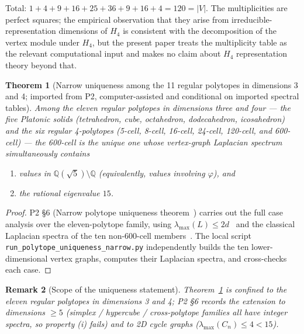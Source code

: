 \documentclass[12pt]{article}
\newtheorem{theorem}{Theorem}
\newtheorem{remark}[theorem]{Remark}
\newcommand{\phig}{\varphi}
\begin{document}
Total: $1+4+9+16+25+36+9+16+4 = 120 = |V|$. The multiplicities are perfect squares; the empirical observation that they arise from irreducible-representation dimensions of $H_4$ is consistent with the decomposition of the vertex module under $H_4$, but the present paper treats the multiplicity table as the relevant computational input and makes no claim about $H_4$ representation theory beyond that.

\begin{theorem}[Narrow uniqueness among the 11 regular polytopes in dimensions 3 and 4; imported from P2, computer-assisted and conditional on imported spectral tables]\label{thm:uniqueness}
Among the eleven regular polytopes in dimensions three and four --- the five Platonic solids (tetrahedron, cube, octahedron, dodecahedron, icosahedron) and the six regular 4-polytopes (5-cell, 8-cell, 16-cell, 24-cell, 120-cell, and 600-cell) --- the 600-cell is the unique one whose vertex-graph Laplacian spectrum simultaneously contains
\begin{enumerate}
    \item[\textup{(i)}] values in $\mathbb{Q}(\sqrt{5}) \setminus \mathbb{Q}$ (equivalently, values involving $\phig$), and
    \item[\textup{(ii)}] the rational eigenvalue $15$.
\end{enumerate}
\end{theorem}

\begin{proof}
P2 \S 6 (Narrow polytope uniqueness theorem~\citep{CascadeAlgSubstrate}) carries out the full case analysis over the eleven-polytope family, using $\lambda_{\max}(L) \leq 2d$~\citep[Ch.~13]{GodsilRoyle2001} and the classical Laplacian spectra of the ten non-600-cell members~\citep[Ch.~3]{BrouwerHaemers2012}. The local script \texttt{run\_polytope\_uniqueness\_narrow.py} independently builds the ten lower-dimensional vertex graphs, computes their Laplacian spectra, and cross-checks each case.
\end{proof}

\begin{remark}[Scope of the uniqueness statement]
Theorem~\ref{thm:uniqueness} is confined to the eleven regular polytopes in dimensions 3 and 4; P2 \S 6 records the extension to dimensions $\geq 5$ (simplex / hypercube / cross-polytope families all have integer spectra, so property (i) fails) and to 2D cycle graphs ($\lambda_{\max}(C_n) \leq 4 < 15$).
\end{remark}
\end{document}

